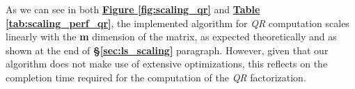 \vspace*{-1cm}
\begin{table}[H]
    \begin{center}
    \begin{adjustwidth}{0.cm}{}
    \begin{center}
    \end{center}
    \end{adjustwidth}
    \caption{Scaling performances of the implemented algorithm \textbf{(A3)} and the \texttt{Numpy} one. Time is expressed in milliseconds.}
    \label{tab:scaling_perf_qr}
    \end{center}
\end{table}
As we can see in both \hyperref[fig:scaling_qr]{\textbf{Figure \ref{fig:scaling_qr}}} and \hyperref[tab:scaling_perf]{\textbf{Table \ref{tab:scaling_perf_qr}}}, the implemented algorithm for \textit{QR} computation scales linearly with the \textbf{m} dimension of the matrix, as expected theoretically and as shown at the end of  \textbf{\S\ref{sec:ls_scaling}} paragraph. However, given that our algorithm does not make use of extensive optimizations, this reflects on the completion time required for the computation of the \textit{QR} factorization.

